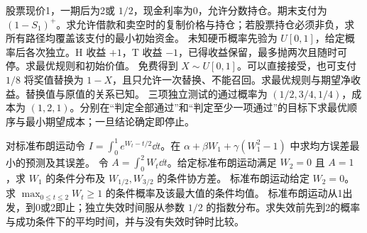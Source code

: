 股票现价1，一期后为2或 $1/2$，现金利率为0，允许分数持仓。期末支付为 $(1-S_1)^+$。求允许借款和卖空时的复制价格与持仓；若股票持仓必须非负，求所有路径均覆盖该支付的最小初始资金。
未知硬币概率先验为 $U[0,1]$，给定概率后各次独立。H 收益 $+1$，T 收益 $-1$，已得收益保留，最多抛两次且随时可停。求最优规则和初始价值。
免费得到 $X\sim U[0,1]$。可以直接接受，也可支付 $1/8$ 将奖值替换为 $1-X$，且只允许一次替换、不能召回。求最优规则与期望净收益。替换值与原值的关系已知。
三项独立测试的通过概率为 $(1/2,3/4,1/4)$，成本为 $(1,2,1)$。分别在“判定全部通过”和“判定至少一项通过”的目标下求最优顺序与最小期望成本；一旦结论确定即停止。

对标准布朗运动令 $I=\int_0^1 e^{W_t-t/2}\dd t$。在 $\alpha+\beta W_1+\gamma(W_1^2-1)$ 中求均方误差最小的预测及其误差。
令 $A=\int_0^2W_t\dd t$。给定标准布朗运动满足 $W_2=0$ 且 $A=1$，求 $W_1$ 的条件分布及 $W_{1/2},W_{3/2}$ 的条件协方差。
标准布朗运动给定 $W_2=0$。求 $\max_{0\le t\le2}W_t\ge1$ 的条件概率及该最大值的条件均值。
标准布朗运动从1出发，到0或2即止；独立失效时间服从参数 $1/2$ 的指数分布。求失效前先到2的概率与成功条件下的平均时间，并与没有失效时钟时比较。
